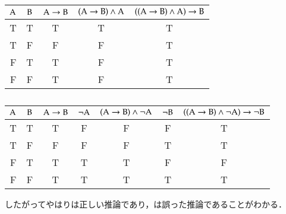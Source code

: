 \documentclass[10pt,b5paper,papersize,dvipdfmx]{jsbook}
\begin{document}
\begin{table}[H]
  \centering
  \caption{}
  \begin{tabular}{cc|ccc}\hline
    $\mathrm{A}$ & $\mathrm{B}$ & $\rmA \to \rmB$ & $(\rmA \to \rmB) \land \rmA$ & $((\rmA \to \rmB) \land \rmA) \to \rmB$ \\ \hline
    T & T & T & T & T \\
    T & F & F & F & T \\
    F & T & T & F & T \\
    F & F & T & F & T \\ \hline
  \end{tabular}
\end{table}
\begin{table}[H]
  \centering
  \caption{}
  \begin{tabular}{cc|ccccc}\hline
    $\mathrm{A}$ & $\mathrm{B}$ & $\rmA \to \rmB$ & $\lnot \mathrm{A}$ & $(\rmA \to \rmB) \land \lnot\rmA$ & $\lnot\mathrm{B}$ & $((\rmA \to \rmB) \land \lnot\rmA) \to \lnot\rmB$ \\ \hline
    T & T & T & F & F & F & T \\
    T & F & F & F & F & T & T \\
    F & T & T & T & T & F & F \\
    F & F & T & T & T & T & T \\ \hline
  \end{tabular}
\end{table}
したがってやはりは正しい推論であり，は誤った推論であることがわかる．
\end{document}
